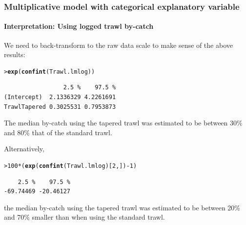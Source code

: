 \documentclass{beamer}\usepackage[]{graphicx}\usepackage[]{xcolor}
\makeatletter
\newcommand{\hlnum}[1]{\textcolor[rgb]{0.686,0.059,0.569}{#1}}%
\newcommand{\hlopt}[1]{\textcolor[rgb]{0,0,0}{#1}}%
\newcommand{\hlstd}[1]{\textcolor[rgb]{0.345,0.345,0.345}{#1}}%
\newcommand{\hlkwd}[1]{\textcolor[rgb]{0.737,0.353,0.396}{\textbf{#1}}}%
\newenvironment{kframe}{%
 \def\at@end@of@kframe{}%
 \ifinner\ifhmode%
  \def\at@end@of@kframe{\end{minipage}}%
  \begin{minipage}{\columnwidth}%
 \fi\fi%
 \def\FrameCommand##1{\hskip\@totalleftmargin \hskip-\fboxsep
 \colorbox{shadecolor}{##1}\hskip-\fboxsep
     \hskip-\linewidth \hskip-\@totalleftmargin \hskip\columnwidth}%
 \MakeFramed {\advance\hsize-\width
   \@totalleftmargin\z@ \linewidth\hsize
   \@setminipage}}%
 {\par\unskip\endMakeFramed%
 \at@end@of@kframe}
\newenvironment{knitrout}{}{} %
\makeatother
\begin{document}
\begin{frame}[fragile]
\frametitle{Multiplicative model with categorical explanatory variable}
\framesubtitle{Interpretation: Using logged trawl by-catch}
We need to back-transform to the raw data scale to make sense of the above results:
\medskip

\begin{knitrout}\scriptsize
{}\color{fgcolor}\begin{kframe}
\begin{alltt}
\hlstd{> }\hlkwd{exp}\hlstd{(}\hlkwd{confint}\hlstd{(Trawl.lmlog))}
\end{alltt}
\begin{verbatim}
                 2.5 %    97.5 %
(Intercept)  2.1336329 4.2261691
TrawlTapered 0.3025531 0.7953873
\end{verbatim}
\end{kframe}
\end{knitrout}
\medskip
The median by-catch using the tapered trawl was estimated to be between 30\% and 80\% that of the standard trawl.
\bigskip

Alternatively, 
\begin{knitrout}\scriptsize
{}\color{fgcolor}\begin{kframe}
\begin{alltt}
\hlstd{> }\hlnum{100}\hlopt{*}\hlstd{(}\hlkwd{exp}\hlstd{(}\hlkwd{confint}\hlstd{(Trawl.lmlog)[}\hlnum{2}\hlstd{,])}\hlopt{-}\hlnum{1}\hlstd{)}
\end{alltt}
\begin{verbatim}
    2.5 %    97.5 % 
-69.74469 -20.46127 
\end{verbatim}
\end{kframe}
\end{knitrout}
the median by-catch using the tapered trawl was estimated to be between 20\% and 70\% smaller than when using the standard trawl.
\end{frame}



\end{document}
